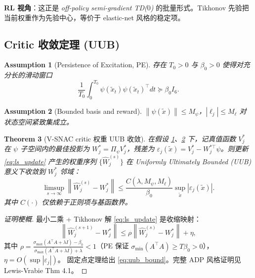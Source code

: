 \documentclass[11pt,a4paper]{article}
\newcommand{\norm}[1]{\left\lVert #1 \right\rVert}
\newtheorem{theorem}{Theorem}
\newtheorem{assumption}[theorem]{Assumption}
\theoremstyle{remark}
\begin{document}
\textbf{RL 视角}：这正是 \emph{off-policy semi-gradient TD($0$)} \cite{sutton2018reinforcement} 的批量形式。Tikhonov 先验把当前权重作为先验中心，等价于 elastic-net 风格的稳定项。

\subsection{Critic 收敛定理 (UUB)}

\begin{assumption}[Persistence of Excitation, PE]\label{assump:pe}
存在 $T_0>0$ 与 $\beta_0>0$ 使得对充分长的滑动窗口
\begin{equation}
\frac{1}{T_0}\int_0^{T_0}\psi(\tilde x_t)\psi(\tilde x_t)^\top dt \succeq \beta_0 I_6.
\end{equation}
\end{assumption}

\begin{assumption}[Bounded basis and reward]\label{assump:bounded}
$\norm{\psi(\tilde x)}\le M_\psi$，$|\ell_j|\le M_\ell$ 对状态空间紧致集成立。
\end{assumption}

\begin{theorem}[V-SNAC critic 权重 UUB 收敛]\label{thm:critic_uub}
在假设 \ref{assump:pe}、\ref{assump:bounded} 下，记真值函数 $V_j^*$ 在 $\psi$ 子空间内的最佳投影为 $W_j^*=\Pi_\psi V_j^*$，残差为 $\varepsilon_j(\tilde x)=V_j^*-W_j^{*\top}\psi$。则更新 \eqref{eq:ls_update} 产生的权重序列 $\{\hat W_j^{(s)}\}$ 在 \emph{Uniformly Ultimately Bounded (UUB)} 意义下收敛到 $W_j^*$ 邻域：
\begin{equation}
\limsup_{s\to\infty}\norm{\hat W_j^{(s)}-W_j^*}\le \frac{C(\lambda,M_\psi,M_\ell)}{\beta_0}\sup_{\tilde x}|\varepsilon_j(\tilde x)|.
\label{eq:uub_bound}
\end{equation}
其中 $C(\cdot)$ 仅依赖于正则项与基函数界。
\end{theorem}

\begin{proof}[证明梗概]
最小二乘 + Tikhonov 解 \eqref{eq:ls_update} 是收缩映射：
\begin{equation}
\norm{\hat W_j^{(s+1)}-W_j^*}\le \rho\norm{\hat W_j^{(s)}-W_j^*}+\eta,
\end{equation}
其中 $\rho=\frac{\sigma_{\max}(A^\top A+\lambda I)-\beta_0}{\sigma_{\max}(A^\top A+\lambda I)+\lambda}<1$（PE 保证 $\sigma_{\min}(A^\top A)\ge T\beta_0>0$），$\eta=O(\sup|\varepsilon_j|)$。
固定点定理给出 \eqref{eq:uub_bound}。完整 ADP 风格证明见 Lewis-Vrabie \cite{lewis2009adaptive} Thm 4.1。
\end{proof}
\end{document}
